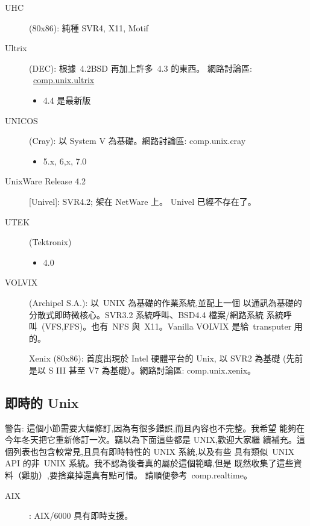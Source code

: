 \documentclass{article}
\begin{document}
\begin{CJK*}{Bg5}{ming}
\begin{description}
     \item [UHC] (80x86): 純種 SVR4, X11, Motif

     \item [Ultrix](DEC):  根據~4.2BSD 再加上許多~4.3 的東西。
         網路討論區: ~\url{comp.unix.ultrix}
	\begin{itemize}
          \item 4.4 是最新版
	\end{itemize}

      \item [UNICOS] (Cray):  以 System V 為基礎。網路討論區: comp.unix.cray
	\begin{itemize}
         \item 5.x, 6,x, 7.0
	\end{itemize}

      \item [UnixWare Release 4.2] [Univel]: SVR4.2; 架在 NetWare 上。
           Univel 已經不存在了。

      \item [UTEK] (Tektronix)
	\begin{itemize}
         \item 4.0
	\end{itemize}

      \item [VOLVIX] (Archipel S.A.): 以~UNIX 為基礎的作業系統,並配上一個
      以通訊為基礎的分散式即時微核心。SVR3.2 系統呼叫、BSD4.4 檔案/網路系統
      系統呼叫~(VFS,FFS)。也有~NFS 與~X11。Vanilla VOLVIX 是給~transputer
      用的。

      Xenix (80x86):  首度出現於 Intel 硬體平台的 Unix, 以 SVR2 為基礎
         (先前是以 S III 甚至 V7 為基礎）。網路討論區: comp.unix.xenix。
\end{description}

\subsection{即時的 Unix}

      警告: 這個小節需要大幅修訂,因為有很多錯誤,而且內容也不完整。我希望
      能夠在今年冬天把它重新修訂一次。竊以為下面這些都是 UNIX,歡迎大家繼
      續補充。這個列表也包含較常見,且具有即時特性的 UNIX 系統,以及有些
      具有類似~UNIX API 的非~UNIX 系統。我不認為後者真的屬於這個範疇,但是
      既然收集了這些資料（雞肋）,要捨棄掉還真有點可惜。
      請順便參考~comp.realtime。
\begin{description}
      \item [AIX]: AIX/6000 具有即時支援。


\end{description}
\end{CJK*}
\end{document}
